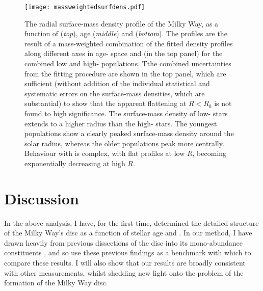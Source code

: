\begin{figure}
 	\texttt{[image: massweightedsurfdens.pdf]}
 	\centering
     \caption[The best fit model for the true radial surface density profile of the Milky Way, as a function of age, \feh{} and \afe{} using mono-age mono-\feh{} populations in APOGEE DR12]{The radial surface-mass density profile of the Milky Way, as a function of \afe{} (\emph{top}), age (\emph{middle}) and \feh{} (\emph{bottom}). The profiles are the result of a mass-weighted combination of the fitted density profiles along different axes in age-\feh{} space and (in the top panel) for the combined low and high-\afe{} populations. Tthe combined uncertainties from the fitting procedure are shown in the top panel, which are sufficient (without addition of the individual statistical and systematic errors on the surface-mass densities, which are substantial) to show that the apparent flattening at $R < R_0$ is not found to high significance. The surface-mass density of low-\afe{} stars extends to a higher radius than the high-\afe{} stars. The youngest populations show a clearly peaked surface-mass density around the solar radius, whereas the older populations peak more centrally. Behaviour with \feh{} is complex, with flat profiles at low $R$, becoming exponentially decreasing at high $R$.}
    \label{fig:profcombo}
 \end{figure}

 \section{Discussion}
 \label{sec:discussiona}
 In the above analysis, I have, for the first time, determined the detailed structure of the Milky Way's disc as a function of stellar age and \feh{}. In our method, I have drawn heavily from previous dissections of the disc into its mono-abundance constituents \citep[MAPs;][]{2012ApJ...753..148B,2016ApJ...823...30B}, and so use these previous findings as a benchmark with which to compare these results. I will also show that our results are broadly consistent with other measurements, whilst shedding new light onto the problem of the formation of the Milky Way disc.


